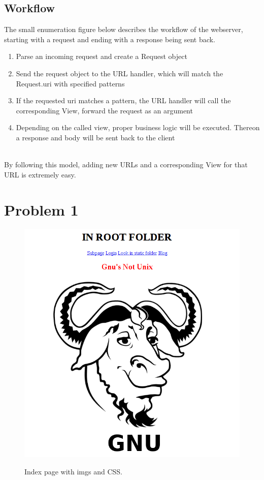 \documentclass[a4paper,12pt]{article} %
\begin{document}
{\subsection{Workflow}

The small enumeration figure below describes the workflow of the webserver,
starting with a request and ending with a response being sent back.

\begin{enumerate}
  \item Parse an incoming request and create a Request object
  \item Send the request object to the URL handler, which will match the Request.uri with specified patterns
  \item If the requested uri matches a pattern, the URL handler will call the corresponding View, forward the request as an argument
  \item Depending on the called view, proper business logic will be executed. Thereon a response and body will be sent back to the client
\end{enumerate}
\\
By following this model, adding new URLs and a corresponding View for that URL is extremely easy.

\section{Problem 1}

\begin{figure}[H]
    \centering  
    \includegraphics[scale=0.5]{img/screenshots/htmlindex.png}
	\label{fig:htmlindex}
	\caption{Index page with imgs and CSS.}
\end{figure}


}
\end{document}
